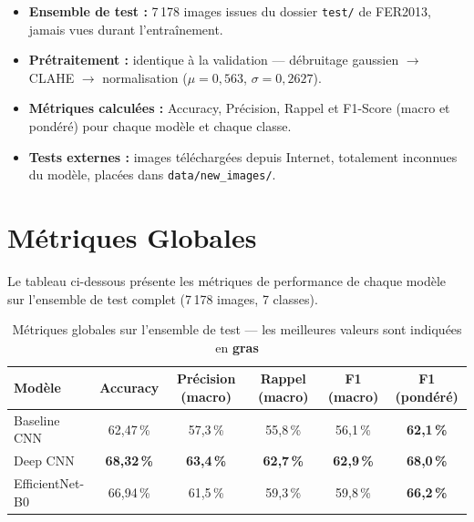 \documentclass[12pt,a4paper]{article}
\begin{document}
\begin{itemize}
  \item \textbf{Ensemble de test :} 7\,178 images issues du dossier \texttt{test/}
        de FER2013, jamais vues durant l'entraînement.
  \item \textbf{Prétraitement :} identique à la validation — débruitage gaussien
        $\rightarrow$ CLAHE $\rightarrow$ normalisation ($\mu=0{,}563$, $\sigma=0{,}2627$).
  \item \textbf{Métriques calculées :} Accuracy, Précision, Rappel et F1-Score
        (macro et pondéré) pour chaque modèle et chaque classe.
  \item \textbf{Tests externes :} images téléchargées depuis Internet,
        totalement inconnues du modèle, placées dans \texttt{data/new\_images/}.
\end{itemize}

\section{Métriques Globales}

Le tableau ci-dessous présente les métriques de performance de chaque modèle
sur l'ensemble de test complet (7\,178 images, 7 classes).

\begin{table}[H]
  \centering
  \caption{Métriques globales sur l'ensemble de test — les meilleures valeurs
           sont indiquées en \textbf{gras}}
  \renewcommand{\arraystretch}{1.4}
  \begin{tabular}{lcccc>{\bfseries}c}
    \toprule
    \textbf{Modèle}
      & \textbf{Accuracy}
      & \textbf{Précision (macro)}
      & \textbf{Rappel (macro)}
      & \textbf{F1 (macro)}
      & \textbf{F1 (pondéré)} \\
    \midrule
    Baseline CNN
      & 62,47\,\%
      & 57,3\,\%
      & 55,8\,\%
      & 56,1\,\%
      & 62,1\,\% \\
    \rowcolor{success!15}
    Deep CNN
      & \textbf{68,32\,\%}
      & \textbf{63,4\,\%}
      & \textbf{62,7\,\%}
      & \textbf{62,9\,\%}
      & \textbf{68,0\,\%} \\
    EfficientNet-B0
      & 66,94\,\%
      & 61,5\,\%
      & 59,3\,\%
      & 59,8\,\%
      & 66,2\,\% \\
    \bottomrule
  \end{tabular}
  \label{tab:global_metrics}
\end{table}
\end{document}
